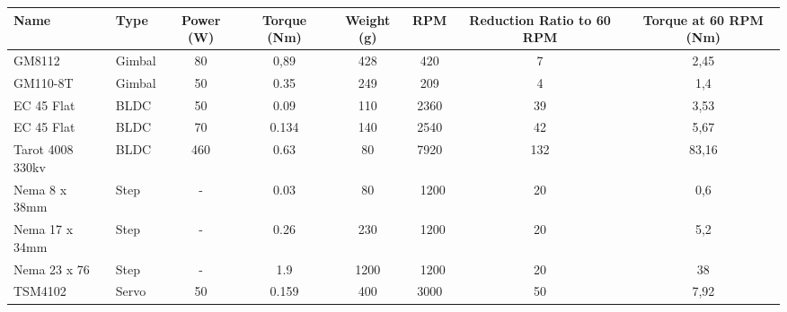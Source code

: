 \begin{table}[H]
\begin{adjustbox}{width={\textwidth}}
		\begin{tabular}{|l|l|c|c|c|c|c|c|}
			\hline
			\textbf{Name}    & \textbf{Type} & \textbf{Power (W)} & \textbf{Torque (Nm)} & \textbf{Weight (g)} & \textbf{RPM} & \textbf{Reduction Ratio to 60 RPM} & \textbf{Torque at 60 RPM (Nm)} \\ \hline
			GM8112           & Gimbal        & 80                 & 0,89                 & 428                 & 420          & 7                                  & 2,45                           \\
			GM110-8T         & Gimbal        & 50                 & 0.35                 & 249                 & 209          & 4                                  & 1,4                            \\
			EC 45 Flat       & BLDC          & 50                 & 0.09                 & 110                 & 2360         & 39                                 & 3,53                           \\
			EC 45 Flat       & BLDC          & 70                 & 0.134                & 140                 & 2540         & 42                                 & 5,67                           \\
			Tarot 4008 330kv & BLDC          & 460                & 0.63                 & 80                  & 7920         & 132                                & 83,16                          \\
			Nema 8 x 38mm    & Step          & -                  & 0.03                 & 80                  & ~1200        & 20                                 & 0,6                            \\
			Nema 17 x 34mm   & Step          & -                  & 0.26                 & 230                 & ~1200        & 20                                 & 5,2                            \\
			Nema 23 x 76     & Step          & -                  & 1.9                  & 1200                & ~1200        & 20                                 & 38                             \\
			TSM4102          & Servo         & 50                 & 0.159                & 400                 & 3000         & 50                                 & 7,92                           \\ \hline
		\end{tabular}
	\end{adjustbox}

\end{table}


